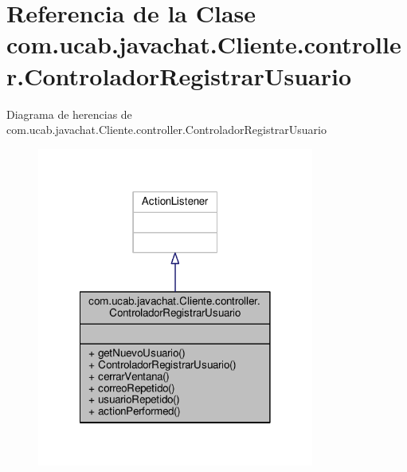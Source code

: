 \hypertarget{classcom_1_1ucab_1_1javachat_1_1_cliente_1_1controller_1_1_controlador_registrar_usuario}{\section{Referencia de la Clase com.\-ucab.\-javachat.\-Cliente.\-controller.\-Controlador\-Registrar\-Usuario}
\label{classcom_1_1ucab_1_1javachat_1_1_cliente_1_1controller_1_1_controlador_registrar_usuario}
}


Diagrama de herencias de com.\-ucab.\-javachat.\-Cliente.\-controller.\-Controlador\-Registrar\-Usuario\nopagebreak
\begin{figure}[H]
\begin{center}
\leavevmode
\includegraphics[width=258pt]{classcom_1_1ucab_1_1javachat_1_1_cliente_1_1controller_1_1_controlador_registrar_usuario__inherit__graph}
\end{center}
\end{figure}


